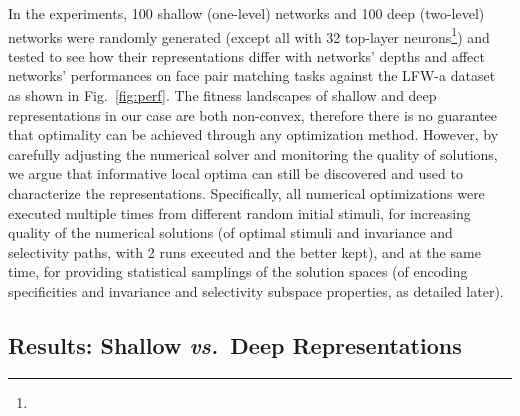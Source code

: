 \documentclass[10pt,twocolumn,letterpaper]{article}
\begin{document}
In the experiments, 100 shallow (\ie one-level) networks and 100 deep (\ie two-level) networks {were} randomly generated (except all with 32 top-layer neurons\footnote{\expsettings}) and tested to see how their representations differ with networks' depths and affect networks' performances on face pair matching tasks against the LFW-a dataset \cite{LFWTech, wolf2011effective} as shown in Fig.~\ref{fig:perf}. %
The fitness landscapes of shallow and deep representations in our case are both non-convex, therefore there is no guarantee that optimality can be achieved through any optimization method.
However, by carefully adjusting the numerical solver and monitoring the quality of solutions, we argue that informative local optima can still be discovered and used to characterize the representations.
Specifically, all numerical optimizations {were} executed multiple times from different random initial stimuli, for increasing quality of the numerical solutions (of optimal stimuli and invariance and selectivity paths, with 2 runs executed and the better kept), and at the same time, for providing statistical samplings of the solution spaces (of encoding specificities and invariance and selectivity subspace properties, as detailed later).


\subsection{Results: Shallow \textbf{\textit{vs.}}~Deep Representations}
\end{document}
